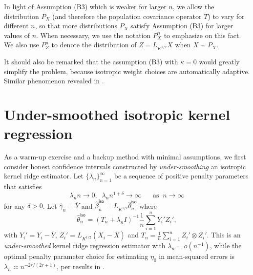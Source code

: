 \documentclass[11pt,a4paper]{article}
\renewcommand{\hat}{\widehat}
\renewcommand{\bar}{\overline}
\theoremstyle{definition}
\theoremstyle{plain}
\theoremstyle{remark}
\newcommand{\iso}{\mathsf{iso}}
\begin{document}
%
%

{\color{red}In light of Assumption (B3) which is weaker for larger $n$, we allow the distribution $P_X$ (and therefore the population covariance operator $T$) to vary for different $n$,
so that more distributions $P_X$ satisfy Assumption (B3) for larger values of $n$.
When necessary, we use the notation $P_X^n$ to emphasize on this fact.
We also use $P_Z^n$ to denote the distribution of $Z=L_{K^{1/2}}X$ when $X\sim P_X$.}

{\color{red}It should also be remarked that the assumption (B3) with $\kappa=0$ would greatly simplify the problem, because isotropic weight choices are automatically adaptive.
Similar phenomenon revealed in \citep{liu2025scalable}.}

\section{Under-smoothed isotropic kernel regression}\label{sec:isotropic}

As a warm-up exercise and a backup method with minimal assumptions, we first consider honest confidence intervals constructed by \emph{under-smoothing} an isotropic kernel ridge estimator.
Let $\{\lambda_n\}_{n=1}^{\infty}$ be a sequence of positive penalty parameters that satisfies
\begin{equation}
\lambda_n n \to 0,\;\; \lambda_n n^{1+\delta}\to \infty\;\;\;\;\;\;\text{as}\;\;n\to\infty
\label{eq:lambdan-1}
\end{equation}
for any $\delta>0$.
Let $\hat\gamma_n = \bar Y$ and $\hat\beta_n^\iso=L_{K^{1/2}}\hat\theta_n^\iso$ where 
$$
\hat\theta_n^\iso = (T_n+\lambda_n I)^{-1}\frac{1}{n}\sum_{i=1}^n Y_i'Z_i',
$$
with $Y_i'=Y_i-\bar Y$, $Z_i'=L_{K^{1/2}}(X_i-\bar X)$ and $T_n=\frac{1}{n}\sum_{i=1}^n Z_i'\otimes Z_i'$.
This is an \emph{under-smoothed} kernel ridge regression estimator with $\lambda_n=o(n^{-1})$, while the optimal penalty parameter choice for estimating $\eta_0$ in mean-squared errors 
is $\lambda_n\asymp n^{-2r/(2r+1)}$, per results in \cite{cai2012minimax}.
\end{document}
